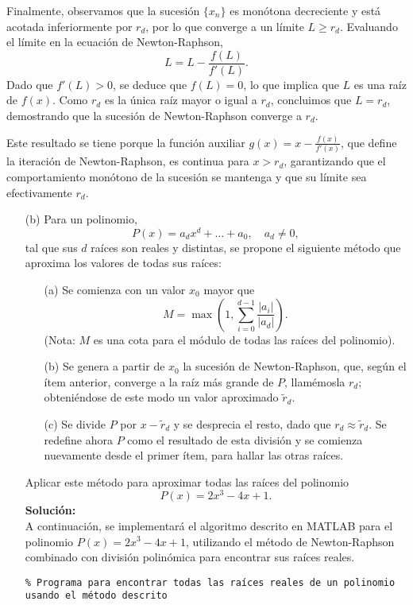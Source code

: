 \begin{homeworkProblem}
\begin{solucion}
    Finalmente, observamos que la sucesión \( \{x_n\} \) es monótona decreciente y está acotada inferiormente por \( r_d \), por lo que converge a un límite \( L \geq r_d \). Evaluando el límite en la ecuación de Newton-Raphson,
\[
L = L - \frac{f(L)}{f'(L)}.
\]
    Dado que \( f'(L) > 0 \), se deduce que \( f(L) = 0 \), lo que implica que \( L \) es una raíz de \( f(x) \). Como \( r_d \) es la única raíz mayor o igual a \( r_d \), concluimos que \( L = r_d \), demostrando que la sucesión de Newton-Raphson converge a \( r_d \).

    Este resultado se tiene porque la función auxiliar \( g(x) = x - \frac{f(x)}{f'(x)} \), que define la iteración de Newton-Raphson, es continua para \( x > r_d \), garantizando que el comportamiento monótono de la sucesión se mantenga y que su límite sea efectivamente \( r_d \).


    \begin{itemize}
      \item[(b)] Para un polinomio,
      \[
      P(x) = a_d x^d + \dots + a_0, \quad a_d \neq 0,
      \]
        tal que sus \( d \) raíces son reales y distintas, se propone el siguiente método que aproxima los valores de todas sus raíces:
        \begin{itemize}
          \item[(a)] Se comienza con un valor \( x_0 \) mayor que
          \[
            M = \max \left( 1, \sum_{i=0}^{d-1} \frac{|a_i|}{|a_d|} \right).
          \]
          (Nota: \( M \) es una cota para el módulo de todas las raíces del polinomio).
          \item[(b)] Se genera a partir de \( x_0 \) la sucesión de Newton-Raphson, que, según el ítem anterior, converge a la raíz más grande de \( P \), llamémosla \( r_d \); obteniéndose de este modo un valor aproximado \( \tilde{r}_d \).
          \item[(c)] Se divide \( P \) por \( x - \tilde{r}_d \) y se desprecia el resto, dado que \( r_d \approx \tilde{r}_d \). Se redefine ahora \( P \) como el resultado de esta división y se comienza nuevamente desde el primer ítem, para hallar las otras raíces.
        \end{itemize}  
    Aplicar este método para aproximar todas las raíces del polinomio
  \[
    P(x) = 2x^3 - 4x + 1.
  \]
  \textbf{Solución:}\\
  A continuación, se implementará el algoritmo descrito en MATLAB para el polinomio \( P(x) = 2x^3 - 4x + 1 \), utilizando el método de Newton-Raphson combinado con división polinómica para encontrar sus raíces reales.
  \begin{lstlisting}
% Programa para encontrar todas las raíces reales de un polinomio usando el método descrito


\end{lstlisting}
\end{itemize}
\end{solucion}
\end{homeworkProblem}
